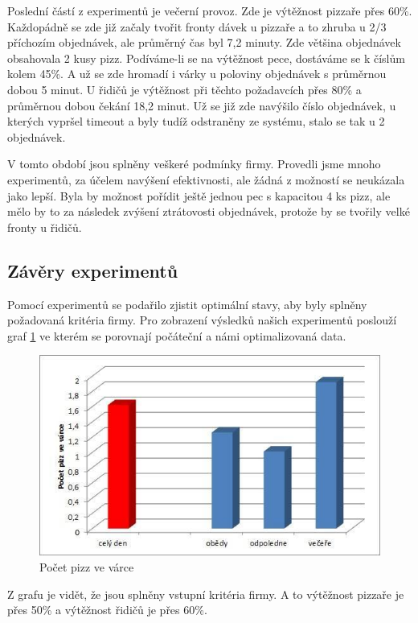 \documentclass[a4paper, 12pt]{article}[9.12.2013]
\begin{document}
Poslední částí z experimentů je večerní provoz. Zde je výtěžnost pizzaře přes
60\%. Každopádně se zde již začaly tvořit fronty dávek u pizzaře a to zhruba u
2/3 příchozím objednávek, ale průměrný čas byl 7,2 minuty. Zde většina
objednávek obsahovala 2 kusy pizz. Podíváme-li se na výtěžnost pece, dostáváme
se k číslům kolem 45\%. A už se zde hromadí i várky u poloviny objednávek s
průměrnou dobou 5 minut. U řidičů je výtěžnost při těchto požadavcích přes 80\%
a průměrnou dobou čekání 18,2 minut. Už se již zde navýšilo číslo objednávek, u
kterých vypršel timeout a byly tudíž odstraněny ze systému, stalo se tak u 2
objednávek.


V tomto období jsou splněny veškeré podmínky firmy. Provedli jsme mnoho
experimentů, za účelem navýšení efektivnosti, ale žádná z možností se neukázala
jako lepší. Byla by možnost pořídit ještě jednou pec s kapacitou 4 ks pizz, ale
mělo by to za následek zvýšení ztrátovosti objednávek, protože by se tvořily
velké fronty u řidičů.

\subsection{Závěry experimentů} \label{experimenty:zavery}
Pomocí experimentů se podařilo zjistit optimální stavy, aby byly splněny
požadovaná kritéria firmy. Pro zobrazení výsledků našich experimentů poslouží
graf \ref{fig:3} ve kterém se porovnají počáteční a námi optimalizovaná data.

\begin{figure}[h]
    \centering
    \includegraphics[width=\textwidth,height=\textheight,keepaspectratio]{3.jpg}
    \caption{Počet pizz ve várce}
    \label{fig:3}
\end{figure}

Z grafu je vidět, že jsou splněny vstupní kritéria firmy. A to výtěžnost
pizzaře je přes 50\% a výtěžnost řidičů je přes 60\%.
\clearpage
\end{document}
